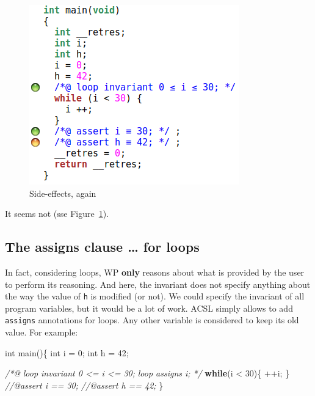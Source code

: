 \documentclass[12pt,francais,]{scrbook}
\newenvironment{Shaded}{}{}
\newcommand{\KeywordTok}[1]{\textcolor[rgb]{0.00,0.44,0.13}{\textbf{{#1}}}}
\newcommand{\DataTypeTok}[1]{\textcolor[rgb]{0.56,0.13,0.00}{{#1}}}
\newcommand{\DecValTok}[1]{\textcolor[rgb]{0.25,0.63,0.44}{{#1}}}
\newcommand{\CommentTok}[1]{\textcolor[rgb]{0.38,0.63,0.69}{\textit{{#1}}}}
\newcommand{\NormalTok}[1]{{#1}}
\begin{document}
\begin{figure}[htbp]
  \centering
  \includegraphics[scale=0.5]{3-3-boucle-effet-bord.png}
  \caption{Side-effects, again}
  \label{fig:3-3-loop-side-effect}
\end{figure}

It seems not (sse Figure~\ref{fig:3-3-loop-side-effect}).

\subsection{The assigns clause \ldots{} for
loops}\label{the-assigns-clause-for-loops}

In fact, considering loops, WP \textbf{only} reasons about what is
provided by the user to perform its reasoning. And here, the invariant
does not specify anything about the way the value of \texttt{h} is
modified (or not). We could specify the invariant of all program
variables, but it would be a lot of work. ACSL simply allows to add
\texttt{assigns} annotations for loops. Any other variable is considered
to keep its old value. For example:

\begin{footnotesize}\begin{Shaded}
\begin{Highlighting}[]
\DataTypeTok{int} \NormalTok{main()\{}
  \DataTypeTok{int} \NormalTok{i = }\DecValTok{0}\NormalTok{;}
  \DataTypeTok{int} \NormalTok{h = }\DecValTok{42}\NormalTok{;}
  
  \CommentTok{/*@}
\CommentTok{    loop invariant 0 <= i <= 30;}
\CommentTok{    loop assigns i;}
\CommentTok{  */}
  \KeywordTok{while}\NormalTok{(i < }\DecValTok{30}\NormalTok{)\{}
    \NormalTok{++i;}
  \NormalTok{\}}
  \CommentTok{//@assert i == 30;}
  \CommentTok{//@assert h == 42;}
\NormalTok{\}}
\end{Highlighting}
\end{Shaded}\end{footnotesize}
\end{document}
